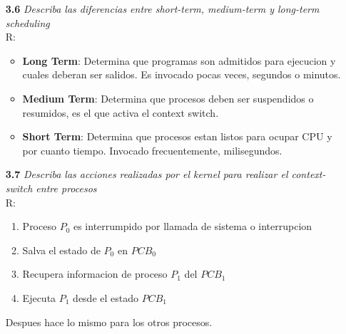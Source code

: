\begin{itemize}
\item[\textbf{3.6}]\emph{ Describa las diferencias entre short-term, medium-term y long-term scheduling}\\
R:
	\begin{itemize}
		\item \textbf{Long Term}: Determina que programas son admitidos para ejecucion y cuales deberan ser salidos. Es invocado pocas veces, segundos o minutos.
		\item \textbf{Medium Term}: Determina que procesos deben ser suspendidos o resumidos, es el que activa el context switch.
		\item \textbf{Short Term}: Determina que procesos estan listos para ocupar CPU y por cuanto tiempo. Invocado frecuentemente, milisegundos.
	\end{itemize}

\item[\textbf{3.7}]\emph{ Describa las acciones realizadas por el kernel para realizar el context-switch entre procesos }\\
R:
	\begin{enumerate}
		\item Proceso $P_{0}$ es interrumpido por llamada de sistema o interrupcion
		\item Salva el estado de $P_{0}$ en $PCB_{0}$
		\item Recupera informacion de proceso $P_{1}$ del $PCB_{1}$
		\item Ejecuta $P_{1}$ desde el estado $PCB_{1}$
	\end{enumerate}
Despues hace lo mismo para los otros procesos.


\end{itemize}

